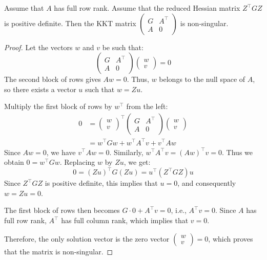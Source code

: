 \begin{lemme}
    Assume that $A$ has full row rank. Assume that the reduced Hessian matrix $Z^\top G Z$ is positive definite.
    Then the KKT matrix $\begin{pmatrix} G & A^\top \\ A & 0 \end{pmatrix}$ is non-singular.
\end{lemme}

\begin{proof}
    Let the vectors $w$ and $v$ be such that:
    \begin{equation}
        \begin{pmatrix}
            G & A^\top \\
            A & 0
        \end{pmatrix}
        \begin{pmatrix}
            w \\
            v
        \end{pmatrix}
        = 0
    \end{equation}
    The second block of rows gives $Aw = 0$. Thus, $w$ belongs to the null space of $A$, so there exists a vector $u$ such that $w = Zu$.
    
    Multiply the first block of rows by $w^\top$ from the left:
    \begin{align*}
        0 &= \begin{pmatrix} w \\ v \end{pmatrix}^\top \begin{pmatrix} G & A^\top \\ A & 0 \end{pmatrix} \begin{pmatrix} w \\ v \end{pmatrix} \\
          &= w^\top G w + w^\top A^\top v + v^\top A w
    \end{align*}
    Since $Aw = 0$, we have $v^\top A w = 0$. Similarly, $w^\top A^\top v = (Aw)^\top v = 0$.
    Thus we obtain $0 = w^\top G w$.
    Replacing $w$ by $Zu$, we get:
    \begin{equation}
        0 = (Zu)^\top G (Zu) = u^\top (Z^\top G Z) u
    \end{equation}
    Since $Z^\top G Z$ is positive definite, this implies that $u = 0$, and consequently $w = Zu = 0$.
    
    The first block of rows then becomes $G \cdot 0 + A^\top v = 0$, i.e., $A^\top v = 0$.
    Since $A$ has full row rank, $A^\top$ has full column rank, which implies that $v = 0$.
    
    Therefore, the only solution vector is the zero vector $\begin{pmatrix} w \\ v \end{pmatrix} = 0$, which proves that the matrix is non-singular.
\end{proof}

